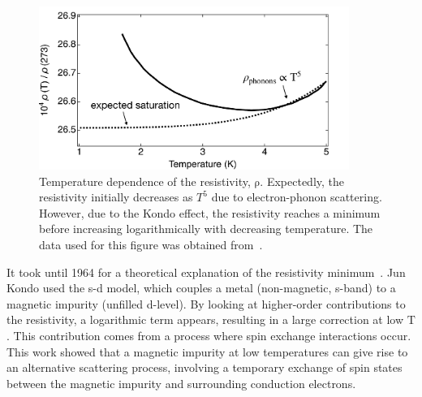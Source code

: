 \begin{figure}[!hbt]
 \begin{center}
  \includegraphics[width=0.9\textwidth]{figures/ch2/figure9.pdf}
  \caption[Kondo Effect in Bulk Materials]{\label{fig:ch2/kondo_bulkmetal} 
  Temperature dependence of the resistivity, $\mathrm{\rho}$. Expectedly, the resistivity initially decreases as $T^5$ due to electron-phonon scattering. However, due to the Kondo effect, the resistivity reaches a minimum before increasing logarithmically with decreasing temperature. The data used for this figure was obtained from~\cite{de_haas}.
   }
 \end{center}
\end{figure}




It took until 1964 for a theoretical explanation of the resistivity minimum~\cite{jun_kondo}. Jun Kondo used the s-d model, which couples a metal (non-magnetic, s-band) to a magnetic impurity (unfilled d-level). By looking at higher-order contributions to the resistivity, a logarithmic term appears, resulting in a large correction at low $\mathrm{T}$. This contribution comes from a process where spin exchange interactions occur. This work showed that a magnetic impurity at low temperatures can give rise to an alternative scattering process, involving a temporary exchange of spin states between the magnetic impurity and surrounding conduction electrons. 

